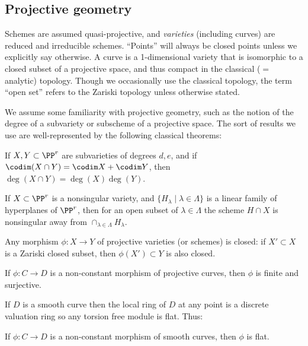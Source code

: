 \subsection{Projective geometry}
Schemes are assumed quasi-projective, and \emph{varieties} (including curves) are reduced and irreducible schemes. ``Points'' will always be closed points unless we explicitly say otherwise. A curve is a 1-dimensional variety that is isomorphic to a closed subset of a projective space, and thus compact in the classical ($=$ analytic) topology. Though we occasionally use the classical topology, 
the term ``open set'' refers to the Zariski topology unless otherwise stated.

We assume some familiarity with projective geometry, such as the notion of the degree of a 
subvariety or subscheme of a projective space. The sort of results we use are
 well-represented by the following classical theorems:

\begin{theorem}
If $X,Y\subset \PP^r$ are subvarieties of degrees $d,e$, and if $\codim(X\cap Y) = \codim X + \codim Y$,
then $\deg (X\cap Y) = \deg(X)\deg(Y)$.
\end{theorem}

\begin{theorem}\label{Bertini}
If $X\subset \PP^r$  is a nonsingular variety, and $\{H_\lambda \mid \lambda\in \Lambda\}$ is a linear family of hyperplanes of $\PP^r$, then for an open subset of $\lambda\in \Lambda$ the scheme $H\cap X$ is nonsingular away from 
$
\cap_{\lambda \in \Lambda} H_\lambda.
$
\end{theorem}

\begin{theorem}
 Any morphism $\phi: X\to Y$ of projective varieties (or schemes) is closed: if $X'\subset X$ is a Zariski closed subset,
 then $\phi(X') \subset Y$ is also closed.
\end{theorem}

\begin{corollary}
If $\phi: C\to D$ is a non-constant morphism of projective curves, then $\phi$ is finite and surjective. 
\end{corollary}

If $D$ is a 
smooth curve then the local ring of $D$ at any point is a discrete valuation ring so any torsion free module is flat. 
Thus:

\begin{proposition}
If $\phi: C\to D$ is a non-constant morphism of smooth curves, then $\phi$ is flat.
\end{proposition}

